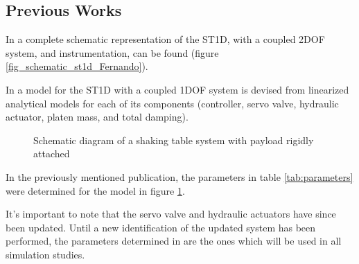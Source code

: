\documentclass[9pt]{extarticle}
\begin{document}
\subsection{Previous Works}

In \cite{oliveira2015} a complete schematic representation of the ST1D, with a coupled 2DOF system, and instrumentation, can be found (figure \ref{fig_schematic_st1d_Fernando}).

In \citet{tekeste2021} a model for the ST1D with a coupled 1DOF system %
is devised from linearized analytical models for each of its components (controller, servo valve, hydraulic actuator, platen mass, and total damping). 

\begin{figure}[H]
    \centering
    \caption{Schematic diagram of a shaking table system with payload rigidly attached \citep{tekeste2021}}
    \label{fig_Tekeste_block_diagram}
\end{figure}

In the previously mentioned publication, the parameters in table \ref{tab:parameters} were determined for the model in figure \ref{fig_Tekeste_block_diagram}. 

It's important to note that the servo valve and hydraulic actuators have since been updated.  Until a new identification of the updated system has been performed, the parameters determined in \cite{tekeste2021} are the ones which will be used in all simulation studies.
\end{document}
